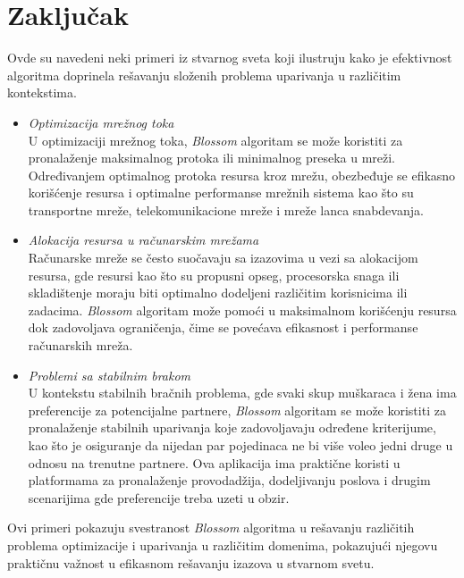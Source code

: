 \documentclass[11pt,a4paper]{article}
\theoremstyle{definition}
\begin{document}
\section{Zaključak}
Ovde su navedeni neki primeri iz stvarnog sveta koji ilustruju kako je efektivnost algoritma doprinela rešavanju složenih problema uparivanja u različitim kontekstima.
\begin{itemize}
\item \textit{Optimizacija mrežnog toka}\\
     U optimizaciji mrežnog toka, \textit{Blossom} algoritam se može koristiti za pronalaženje maksimalnog protoka ili minimalnog preseka u mreži. Određivanjem optimalnog protoka resursa kroz mrežu, obezbeđuje se efikasno korišćenje resursa i optimalne performanse mrežnih sistema kao što su transportne mreže, telekomunikacione mreže i mreže lanca snabdevanja.

\item \textit{Alokacija resursa u računarskim mrežama}\\ Računarske mreže se često suočavaju sa izazovima u vezi sa alokacijom resursa, gde resursi kao što su propusni opseg, procesorska snaga ili skladištenje moraju biti optimalno dodeljeni različitim korisnicima ili zadacima. \textit{Blossom} algoritam može pomoći u maksimalnom korišćenju resursa dok zadovoljava ograničenja, čime se povećava efikasnost i performanse računarskih mreža.

\item \textit{Problemi sa stabilnim brakom}\\ U kontekstu stabilnih bračnih problema, gde svaki skup muškaraca i žena ima preferencije za potencijalne partnere, \textit{Blossom} algoritam se može koristiti za pronalaženje stabilnih uparivanja koje zadovoljavaju određene kriterijume, kao što je osiguranje da nijedan par pojedinaca ne bi više voleo jedni druge u odnosu na trenutne partnere. Ova aplikacija ima praktične koristi u platformama za pronalaženje provodadžija, dodeljivanju poslova i drugim scenarijima gde preferencije treba uzeti u obzir. \cite{sajt3}
\end{itemize}
Ovi primeri pokazuju svestranost \textit{Blossom} algoritma u rešavanju različitih problema optimizacije i uparivanja u različitim domenima, pokazujući njegovu praktičnu važnost u efikasnom rešavanju izazova u stvarnom svetu. 


\newpage

\appendix
 


\appendix
\end{document}
